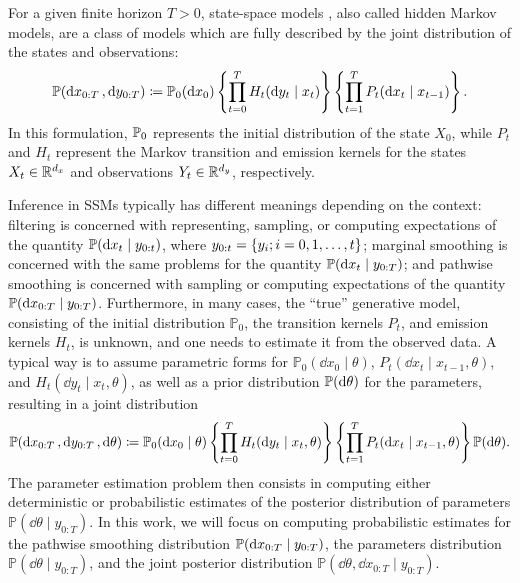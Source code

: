 For a given finite horizon $T>0$, state-space models \citep[SSMs, see, e.g.,][]{DelMoral2004Book,sarkka2013bayesian,Chopin2020book}, also called hidden Markov models, are a class of models which are fully described by the joint distribution of the states and observations:
\begin{equation}
    \label{eq:ssm}
    \mathbb{P}(\dd{x_{0:T}}, \dd{y_{0:T}})
    \coloneqq \mathbb{P}_0(\dd{x_0}) \left\{\prod_{t=0}^T H_t(\dd{y_t} \mid x_t)\right\} \left\{\prod_{t=1}^T P_t(\dd{x_t} \mid x_{t-1}) \right\}.
\end{equation}
In this formulation, $\mathbb{P}_0$ represents the initial distribution of the state $X_0$, while $P_t$ and $H_t$ represent the Markov transition and emission kernels for the states $X_t \in \mathbb{R}^{d_x}$ and observations $Y_t \in \mathbb{R}^{d_y}$, respectively.

Inference in SSMs typically has different meanings depending on the context: filtering is concerned with representing, sampling, or computing expectations of the quantity $\mathbb{P}(\dd{x_t} \mid y_{0:t})$, where $y_{0:t} = \{y_i; i=0, 1, \dots,t\}$; marginal smoothing is concerned with the same problems for the quantity $\mathbb{P}(\dd{x_t} \mid y_{0:T})$; and pathwise smoothing is concerned with sampling or computing expectations of the quantity $\mathbb{P}(\dd{x_{0:T}} \mid y_{0:T})$. Furthermore, in many cases, the ``true'' generative model, consisting of the initial distribution $\mathbb{P}_0$, the transition kernels $P_t$, and emission kernels $H_t$, is unknown, and one needs to estimate it from the observed data. A typical way is to assume parametric forms for $\mathbb{P}_0(\dd{x_0} \mid \theta)$, $P_t(\dd{x_t}\mid x_{t-1}, \theta)$, and $H_t(\dd{y_t}\mid x_t, \theta)$, as well as a prior distribution $\mathbb{P}(\dd{\theta})$ for the parameters, resulting in a joint distribution
\begin{equation}
    \label{eq:parametric-ssm}
    \mathbb{P}(\dd{x_{0:T}}, \dd{y_{0:T}}, \dd{\theta})
    \coloneqq \mathbb{P}_0(\dd{x_0}\mid \theta) \left\{\prod_{t=0}^T H_t(\dd{y_t} \mid x_t, \theta)\right\} \left\{\prod_{t=1}^T P_t(\dd{x_t} \mid x_{t-1}, \theta) \right\} \mathbb{P}(\dd{\theta}).
\end{equation}
The parameter estimation problem then consists in computing either deterministic or probabilistic estimates of the posterior distribution of parameters $\mathbb{P}(\dd{\theta} \mid y_{0:T})$. In this work, we will focus on computing probabilistic estimates for the pathwise smoothing distribution $\mathbb{P}(\dd{x_{0:T}} \mid y_{0:T})$, the parameters distribution $\mathbb{P}(\dd{\theta} \mid y_{0:T})$, and the joint posterior distribution $\mathbb{P}(\dd{\theta}, \dd{x_{0:T}} \mid y_{0:T})$.

